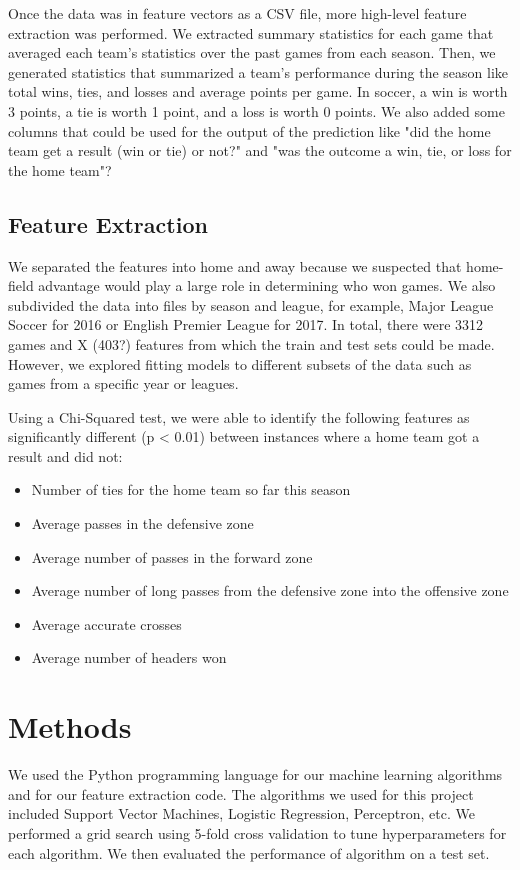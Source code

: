 Once the data was in feature vectors as a CSV file, more high-level feature extraction was performed. We extracted summary statistics for each game that averaged each team's statistics over the past games from each season. Then, we generated statistics that summarized a team's performance during the season like total wins, ties, and losses and average points per game. In soccer, a win is worth 3 points, a tie is worth 1 point, and a loss is worth 0 points. We also added some columns that could be used for the output of the prediction like "did the home team get a result (win or tie) or not?" and "was the outcome a win, tie, or loss for the home team"? 

\subsection{Feature Extraction}
We separated the features into home and away because we suspected that home-field advantage would play a large role in determining who won games. We also subdivided the data into files by season and league, for example, Major League Soccer for 2016 or English Premier League for 2017. In total, there were 3312 games and X (403?) features from which the train and test sets could be made. However, we explored fitting models to different subsets of the data such as games from a specific year or leagues.

Using a Chi-Squared test, we were able to identify the following features as significantly different (p < 0.01) between instances where a home team got a result and did not:

\begin{itemize}
\item Number of ties for the home team so far this season
\item Average passes in the defensive zone
\item Average number of passes in the forward zone
\item Average number of long passes from the defensive zone into the offensive zone 
\item Average accurate crosses
\item Average number of headers won
\end{itemize}


\section{Methods}
We used the Python programming language for our machine learning algorithms and for our feature extraction code. The algorithms we used for this project included Support Vector Machines, Logistic Regression, Perceptron, etc. We performed a grid search using 5-fold cross validation to tune hyperparameters for each algorithm. We then evaluated the performance of algorithm on a test set. 

